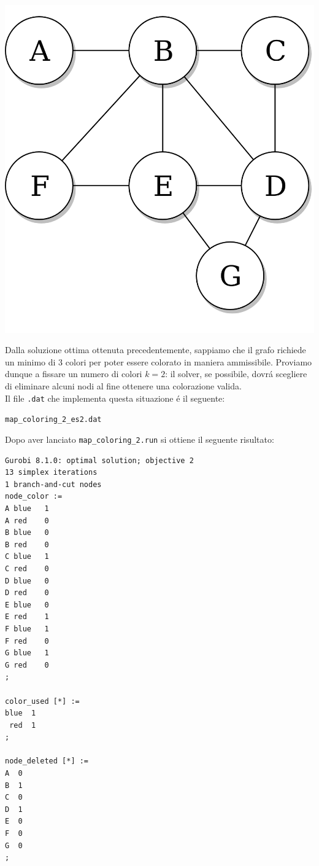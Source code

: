 \documentclass{article}
\begin{document}
\begin{center}
\includegraphics[scale=0.15]{non_complete_graph.png}
\end{center}

Dalla soluzione ottima ottenuta precedentemente, sappiamo che il grafo richiede un minimo di 3 colori per poter essere colorato in maniera ammissibile. Proviamo dunque a fissare un numero di colori $k = 2$: il solver, se possibile, dovr\'a scegliere di eliminare alcuni nodi al fine ottenere una colorazione valida.\\

Il file \texttt{.dat} che implementa questa situazione \'e il seguente:

\vspace{5mm}
\texttt{map\_coloring\_2\_es2.dat}

\vspace{5mm}

\pagebreak

Dopo aver lanciato \texttt{map\_coloring\_2.run} si ottiene il seguente risultato:\\

\begin{verbatim}
Gurobi 8.1.0: optimal solution; objective 2
13 simplex iterations
1 branch-and-cut nodes
node_color :=
A blue   1
A red    0
B blue   0
B red    0
C blue   1
C red    0
D blue   0
D red    0
E blue   0
E red    1
F blue   1
F red    0
G blue   1
G red    0
;

color_used [*] :=
blue  1
 red  1
;

node_deleted [*] :=
A  0
B  1
C  0
D  1
E  0
F  0
G  0
;

\end{verbatim}
\end{document}
